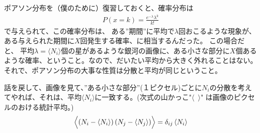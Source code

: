 \documentclass[11pt]{ltjsarticle}
\theoremstyle{plain}
\theoremstyle{break}
\begin{document}
ポアソン分布を（僕のために）復習しておくと、確率分布は
\begin{align}
  P(x=k) = \frac{e^{-\lambda} \lambda^k}{k!}
\end{align}%
で与えられて、この確率分布は、
ある”期間”に平均で$\lambda$回おこるような現象が、ある与えられた期間に$X$回発生する確率、に相当するんだった。
この場合だと、
平均$\lambda=\langle N_i\rangle$個の星があるような銀河の画像に、ある小さな部分に$X$個あるような確率、ということ。なので、だいたい平均から大きく外れることはない。
それで、ポアソン分布の大事な性質は分散と平均が同じということ。

話を戻して、画像を見て、”ある小さな部分”(１ピクセル)ごとに$N_i$の分散を考えてやれば、それは、平均$\langle N_i \rangle$に一致する。(次式の山かっこ"$\langle \,\,\, \rangle$" は画像のピクセルのおける統計平均。)
\begin{align}
  \Bigl\langle\left(N_{i}-\left\langle N_{i}\right\rangle\right)\left(N_{j}-\left\langle N_{j}\right\rangle\right)\Bigr\rangle
  =\delta_{i j}\left\langle N_{i}\right\rangle
\end{align}%
\end{document}
